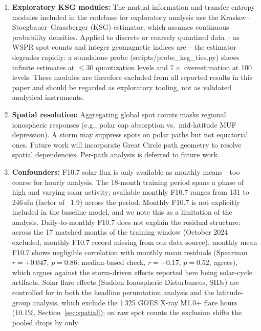 \documentclass{agujournal2019}
\begin{document}
\begin{enumerate}
\item \textbf{Exploratory KSG modules:} The mutual information and
	      transfer entropy modules included in the codebase for
	      exploratory analysis use the Kraskov--Stoegbauer--Grassberger
	      (KSG) estimator, which assumes continuous probability
	      densities. Applied to discrete or coarsely quantized data -- as
	      WSPR spot counts and integer geomagnetic indices are -- the
	      estimator degrades rapidly: a standalone probe
	      (scripts/probe\_ksg\_ties.py) shows infinite estimates at
	      $\le$30 quantization levels and $7\times$ overestimation at
	      100 levels. These modules are therefore excluded from all
	      reported results in this paper and should be regarded as
	      exploratory tooling, not as validated analytical instruments.

	\item \textbf{Spatial resolution:} Aggregating global spot counts masks
	      regional ionospheric responses (e.g., polar cap absorption vs.\
	      mid-latitude MUF depression). A storm may suppress spots on polar
	      paths but not equatorial ones. Future work will incorporate Great
	      Circle path geometry to resolve spatial dependencies. Per-path
	      analysis is deferred to future work.
	\item \textbf{Confounders:} F10.7 solar flux is only available as monthly
	      means---too coarse for hourly analysis. The 18-month training period spans a
	      phase of high and varying solar activity; available monthly F10.7
	      ranges from 131 to 246\,sfu (factor of ~1.9) across the period. Monthly
	      F10.7 is not explicitly included in the baseline model, and we note this
	      as a limitation of the analysis. Daily-to-monthly F10.7 does not explain
	      the residual structure: across the 17 matched months of the training
	      window (October 2024 excluded, monthly F10.7 record missing from our
	      data source), monthly mean F10.7 shows negligible correlation with
	      monthly mean residuals (Spearman $r = +0.047$, $p = 0.86$; median-based
	      check, $r = -0.17$, $p = 0.52$, agrees), which argues against the
	      storm-driven effects reported here being solar-cycle artifacts. Solar flare effects (Sudden
	      Ionospheric Disturbances, SIDs) \citep{mitra1974} are controlled for in both the headline permutation analysis and
	      the latitude-group analysis, which exclude the 1\,325 GOES X-ray
	      M1.0+ flare hours (10.1\%, Section~\ref{sec:spatial}); on raw
	      spot counts the exclusion shifts the pooled drops by only

\end{enumerate}
\end{document}
